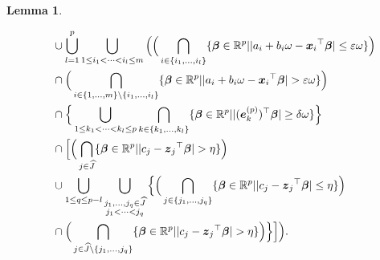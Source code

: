\documentclass[12pt]{article}
\newtheorem{lem}{Lemma}
\def\ep{{\varepsilon}}
\def\de{{\delta}}
\def\ep{{\varepsilon}}
\def\om{{\omega}}
\def\non{{\nonumber}}
\def\de{{\delta}}
\def\ep{{\varepsilon}}
\def\om{{\omega}}
\def\bbe{{\text{\boldmath $\beta$}}}
\def\e{{\text{\boldmath $e$}}}
\def\x{{\text{\boldmath $x$}}}
\def\z{{\text{\boldmath $z$}}}
\def\Jh{{\widehat J}}
\def\non{{\nonumber}}
\begin{document}
\begin{lem}
\begin{itemize}
\begin{align}
&\quad \cup \bigcup_{l = 1}^{p} \bigcup_{1 \le i_1 < \dots < i_l \le m} \Big( \Big( \bigcap_{i \in \{ i_1 , \dots , i_l \} } \{ \bbe \in \mathbb{R} ^p | | a_i + b_i \om - {\x _i}^{\top } \bbe | \le \ep \om \} \Big) \non \\
&\quad \cap \Big( \bigcap_{i \in \{ 1, \dots , m \} \setminus \{ i_1 , \dots , i_l \} } \{ \bbe \in \mathbb{R} ^p | | a_i + b_i \om - {\x _i}^{\top } \bbe | > \ep \om \} \Big) \non \\
&\quad \cap \Big\{ \bigcup_{1 \le k_1 < \dots < k_l \le p} \bigcap_{k \in \{ k_1 , \dots , k_l \} } \{ \bbe \in \mathbb{R} ^p | |( \e _{k}^{(p)} )^{\top } \bbe | \ge \de \om \} \Big\} \non \\
&\quad \cap \Big[ \Big( \bigcap_{j \in \Jh } \{ \bbe \in \mathbb{R} ^p | | c_j - {\z _j}^{\top } \bbe | > \eta \} \Big) \non \\
&\quad \cup \bigcup_{1 \le q \le p - l} \bigcup_{\substack{j_1 , \dots , j_q \in \Jh \\ j_1 < \dots < j_q}} \Big\{ \Big( \bigcap_{j \in \{ j_1 , \dots , j_q \} } \{ \bbe \in \mathbb{R} ^p | | c_j - {\z _j}^{\top } \bbe | \le \eta \} \Big) \non \\
&\quad \cap \Big( \bigcap_{j \in \Jh \setminus \{ j_1 , \dots , j_q \} } \{ \bbe \in \mathbb{R} ^p | | c_j - {\z _j}^{\top } \bbe | > \eta \} \Big) \Big\} \Big] \Big) \text{.} \non 
\end{align}
\end{itemize}
\end{lem}
\end{document}
